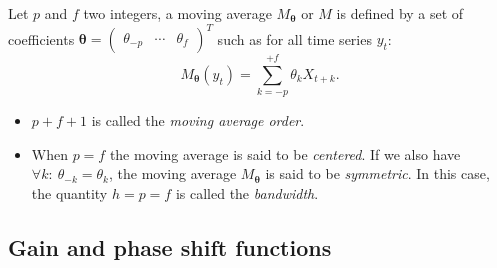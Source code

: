 \documentclass[
]{article}
\newcommand\transp[1]{{#1}^T}
\newcommand\1{\mathds{1}}
\begin{document}
Let \(p\) and \(f\) two integers, a moving average
\(M_{\boldsymbol\theta}\) or \(M\) is defined by a set of coefficients
\(\boldsymbol\theta=\transp{\begin{pmatrix}\theta_{-p}&\cdots&\theta_{f}\end{pmatrix}}\)
such as for all time series \(y_t\): \[
M_{\boldsymbol\theta}(y_t)=\sum_{k=-p}^{+f}\theta_kX_{t+k}.
\]

\begin{itemize}
\item
  \(p+f+1\) is called the \emph{moving average order}.
\item
  When \(p=f\) the moving average is said to be \emph{centered}. If we
  also have \(\forall k:\:\theta_{-k} = \theta_k\), the moving average
  \(M_{\boldsymbol\theta}\) is said to be \emph{symmetric}. In this
  case, the quantity \(h=p=f\) is called the \emph{bandwidth}.
\end{itemize}

\subsection{Gain and phase shift functions}\label{subsec:gain-deph}
\end{document}
